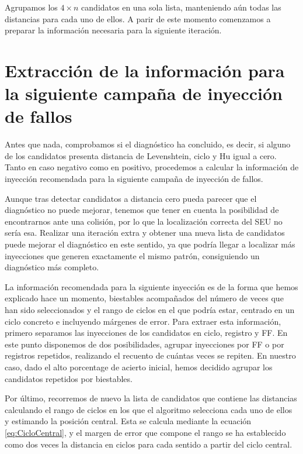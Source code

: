 Agrupamos los $4 \times n$ candidatos en una sola lista, manteniendo aún todas las
distancias para cada uno de ellos. A parir de este momento comenzamos a preparar
la información necesaria para la siguiente iteración.


\section{Extracción de la información para la siguiente campaña de inyección de
fallos}
\label{sec:InfoCampana}
Antes que nada, comprobamos si el diagnóstico
ha concluido, es decir, si alguno de los candidatos presenta distancia de
Levenshtein, ciclo y Hu igual a cero. Tanto en caso negativo como en positivo, 
procedemos a calcular la información de inyección recomendada para la siguiente 
campaña de inyección de fallos.

Aunque tras detectar candidatos a distancia cero pueda parecer que el diagnóstico
no puede mejorar, tenemos que tener en cuenta la posibilidad de encontrarnos ante
una colisión, por lo que la localización correcta del \gls{SEU} no sería esa.
Realizar una iteración extra y obtener una nueva lista de candidatos puede mejorar
el diagnóstico en este sentido, ya que podría llegar a localizar más inyecciones
que generen exactamente el mismo patrón, consiguiendo un diagnóstico más completo.

La información recomendada para la siguiente inyección es de la forma que hemos
explicado hace un momento, biestables acompañados del número de veces que han sido
seleccionados y el rango de ciclos en el que podría estar, centrado en un ciclo
concreto e incluyendo márgenes de error. Para extraer esta información, primero
separamos las inyecciones de los candidatos en ciclo, registro y \gls{FF}. En este
punto disponemos de dos posibilidades, agrupar inyecciones por \gls{FF} o por
registros repetidos, realizando el recuento de cuántas veces se repiten. En 
nuestro caso, dado el alto porcentage de acierto inicial, hemos decidido agrupar 
los candidatos repetidos por biestables.

Por último, recorremos de nuevo la lista de candidatos que contiene las
distancias calculando el rango de ciclos en los que el algoritmo selecciona cada
uno de ellos y estimando la posición central. Esta se calcula mediante la ecuación
\ref{eq:CicloCentral}, y el margen de error que compone el rango se ha establecido
como dos veces la distancia en ciclos para cada sentido a partir del ciclo central.

